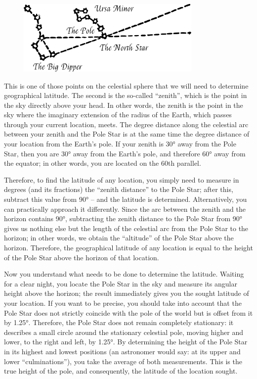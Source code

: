 \begin{figure}[h!]
\centering
\includegraphics[width=0.8\textwidth]{figures/ch-07/fig-107.pdf}
\end{figure}



This is one of those points on the celestial sphere that we will need to determine geographical latitude. The second is the so-called ``zenith'', which is the point in the sky directly above your head. In other words, the zenith is the point in the sky where the imaginary extension of the radius of the Earth, which passes through your current location, meets. The degree distance along the celestial arc between your zenith and the Pole Star is at the same time the degree distance of your location from the Earth's pole. If your zenith is \ang{30} away from the Pole Star, then you are \ang{30} away from the Earth's pole, and therefore \ang{60} away from the equator; in other words, you are located on the 60th parallel.

Therefore, to find the latitude of any location, you simply need to measure in degrees (and its fractions) the ``zenith distance'' to the Pole Star; after this, subtract this value from \ang{90} -- and the latitude is determined. Alternatively, you can practically approach it differently. Since the arc between the zenith and the horizon contains \ang{90}, subtracting the zenith distance to the Pole Star from \ang{90} gives us nothing else but the length of the celestial arc from the Pole Star to the horizon; in other words, we obtain the ``altitude'' of the Pole Star above the horizon. Therefore, the geographical latitude of any location is equal to the height of the Pole Star above the horizon of that location.

Now you understand what needs to be done to determine the latitude. Waiting for a clear night, you locate the Pole Star in the sky and measure its angular height above the horizon; the result immediately gives you the sought latitude of your location. If you want to be precise, you should take into account that the Pole Star does not strictly coincide with the pole of the world but is offset from it by \ang{1.25}. Therefore, the Pole Star does not remain completely stationary: it describes a small circle around the stationary celestial pole, moving higher and lower, to the right and left, by \ang{1.25}. By determining the height of the Pole Star in its highest and lowest positions (an astronomer would say: at its upper and lower ``culminations''), you take the average of both measurements. This is the true height of the pole, and consequently, the latitude of the location sought.



